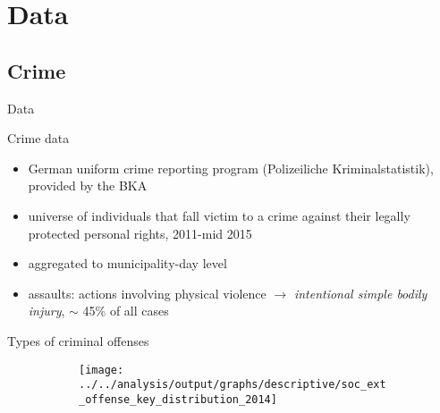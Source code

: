 \documentclass[usenames,dvipsnames]{beamer} %
\begin{document}
\section{Data}
	\subsection{Crime}
	\begin{frame}{Data}
		\begin{block}{Crime data}
			\begin{itemize}
				\item German uniform crime reporting program (Polizeiliche Kriminalstatistik), provided by the BKA
				\item universe of individuals that fall victim to a crime against their legally protected personal rights, 2011-mid 2015
				\item aggregated to municipality-day level
				\item assaults: actions involving physical violence $\rightarrow$ \textit{intentional simple bodily injury}, $\sim$ 45\% of all cases
			\end{itemize}
		\end{block}	
	\end{frame}





	\begin{frame}{Types of criminal offenses}
		\begin{figure}
			\begin{figure}
				\texttt{[image: ../../analysis/output/graphs/descriptive/soc\_ext\_offense\_key\_distribution\_2014]}
			\end{figure}
		\end{figure}
	\end{frame}
\end{document}
